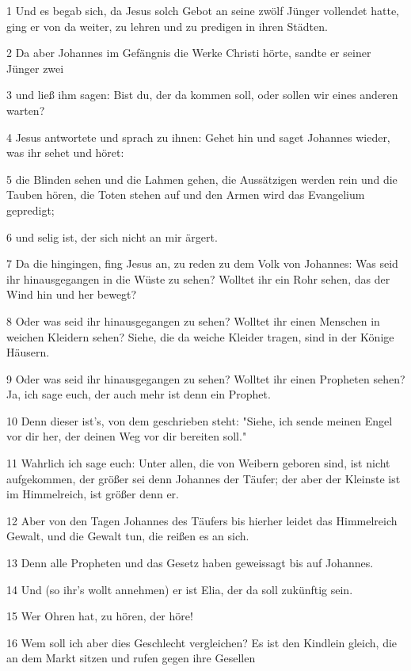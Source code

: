 \par 1 Und es begab sich, da Jesus solch Gebot an seine zwölf Jünger vollendet hatte, ging er von da weiter, zu lehren und zu predigen in ihren Städten.
\par 2 Da aber Johannes im Gefängnis die Werke Christi hörte, sandte er seiner Jünger zwei
\par 3 und ließ ihm sagen: Bist du, der da kommen soll, oder sollen wir eines anderen warten?
\par 4 Jesus antwortete und sprach zu ihnen: Gehet hin und saget Johannes wieder, was ihr sehet und höret:
\par 5 die Blinden sehen und die Lahmen gehen, die Aussätzigen werden rein und die Tauben hören, die Toten stehen auf und den Armen wird das Evangelium gepredigt;
\par 6 und selig ist, der sich nicht an mir ärgert.
\par 7 Da die hingingen, fing Jesus an, zu reden zu dem Volk von Johannes: Was seid ihr hinausgegangen in die Wüste zu sehen? Wolltet ihr ein Rohr sehen, das der Wind hin und her bewegt?
\par 8 Oder was seid ihr hinausgegangen zu sehen? Wolltet ihr einen Menschen in weichen Kleidern sehen? Siehe, die da weiche Kleider tragen, sind in der Könige Häusern.
\par 9 Oder was seid ihr hinausgegangen zu sehen? Wolltet ihr einen Propheten sehen? Ja, ich sage euch, der auch mehr ist denn ein Prophet.
\par 10 Denn dieser ist's, von dem geschrieben steht: "Siehe, ich sende meinen Engel vor dir her, der deinen Weg vor dir bereiten soll."
\par 11 Wahrlich ich sage euch: Unter allen, die von Weibern geboren sind, ist nicht aufgekommen, der größer sei denn Johannes der Täufer; der aber der Kleinste ist im Himmelreich, ist größer denn er.
\par 12 Aber von den Tagen Johannes des Täufers bis hierher leidet das Himmelreich Gewalt, und die Gewalt tun, die reißen es an sich.
\par 13 Denn alle Propheten und das Gesetz haben geweissagt bis auf Johannes.
\par 14 Und (so ihr's wollt annehmen) er ist Elia, der da soll zukünftig sein.
\par 15 Wer Ohren hat, zu hören, der höre!
\par 16 Wem soll ich aber dies Geschlecht vergleichen? Es ist den Kindlein gleich, die an dem Markt sitzen und rufen gegen ihre Gesellen

